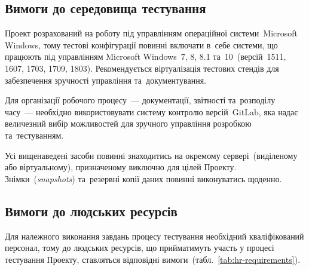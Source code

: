 \documentclass[a4paper,oneside,BCOR=1cm,DIV=12,12pt,headings=normal]{scrartcl}
\begin{document}
		\subsection{Вимоги до середовища тестування}
			Проект розрахований на роботу під управлінням операційної системи~Microsoft Windows, тому тестові конфігурації повинні включати в~себе системи, що працюють під управлінням Microsoft Windows~7, 8, 8.1 та~10~(версій~1511, 1607, 1703, 1709, 1803). Рекомендується віртуалізація тестових стендів для забезпечення зручності управління та~документування.

			Для організації робочого процесу~— документації, звітності та~розподілу часу~— необхідно використовувати систему контролю версій~GitLab, яка надає величезний вибір можливостей для зручного управління розробкою та~тестуванням.

			Усі вищенаведені засоби повинні знаходитись на окремому сервері~(виділеному або віртуальному), призначеному виключно для цілей Проекту. Знімки~(\emph{snapshots}) та~резервні копії даних повинні виконуватись щоденно.

		\subsection{Вимоги до людських ресурсів}
			Для належного виконання завдань процесу тестування необхідний кваліфікований персонал, тому до людських ресурсів, що прийматимуть участь у процесі тестування Проекту, ставляться відповідні вимоги~(табл.~\ref{tab:hr-requirements}).
\end{document}
